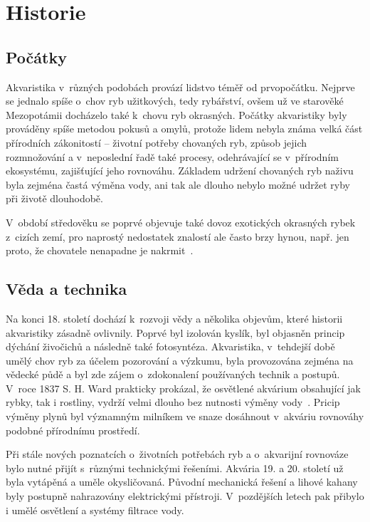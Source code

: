 \section{Historie}
\subsection{Počátky}
Akvaristika v~různých podobách provází lidstvo téměř od prvopočátku. Nejprve se jednalo spíše o~chov ryb užitkových, tedy rybářství, ovšem už ve starověké Mezopotámii docházelo také k~chovu ryb okrasných. Počátky akvaristiky byly prováděny spíše metodou pokusů a omylů, protože lidem nebyla známa velká část přírodních zákonitostí -- životní potřeby chovaných ryb, způsob jejich rozmnožování a v~neposlední řadě také procesy, odehrávající se v~přírodním ekosystému, zajišťující jeho rovnováhu. Základem udržení chovaných ryb naživu byla zejména častá výměna vody, ani tak ale dlouho nebylo možné udržet ryby při životě dlouhodobě. 

V~období středověku se poprvé objevuje také dovoz exotických okrasných rybek z~cizích zemí, pro naprostý nedostatek znalostí ale často brzy hynou, např. jen proto, že chovatele nenapadne je nakrmit~\cite{vitek_akvaristika}.

\subsection{Věda a technika}
Na konci 18. století dochází k~rozvoji vědy a několika objevům, které historii akvaristiky zásadně ovlivnily. Poprvé byl izolován kyslík, byl objasněn princip dýchání živočichů a následně také fotosyntéza. Akvaristika, v~tehdejší době umělý chov ryb za účelem pozorování a výzkumu, byla provozována zejména na vědecké půdě a byl zde zájem o~zdokonalení používaných technik a postupů. V~roce 1837 S. H. Ward prakticky prokázal, že osvětlené akvárium obsahující jak rybky, tak i rostliny, vydrží velmi dlouho bez nutnosti výměny vody~\cite{vitek_akvaristika}. Pricip výměny plynů byl významným milníkem ve snaze dosáhnout v~akváriu rovnováhy podobné přírodnímu prostředí. 

Při stále nových poznatcích o~životních potřebách ryb a o~akvarijní rovnováze bylo nutné přijít s~různými technickými řešeními. Akvária 19. a 20. století už byla vytápěná a uměle okysličovaná. Původní mechanická řešení a lihové kahany byly postupně nahrazovány elektrickými přístroji. V~pozdějších letech pak přibylo i umělé osvětlení a systémy filtrace vody. 